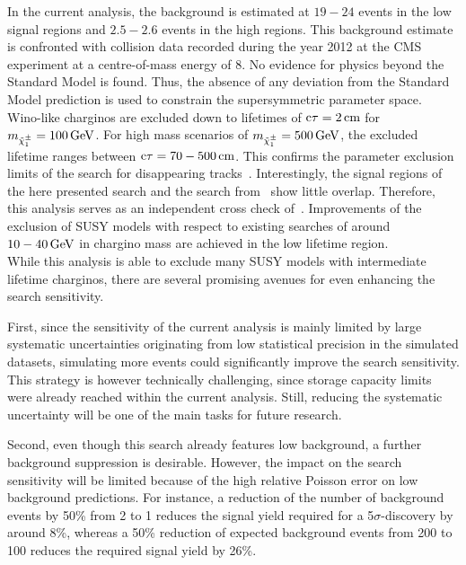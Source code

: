 In the current analysis, the background is estimated at $19-24$ events in the low \ias signal regions and $2.5-2.6$ events in the high \ias regions.
This background estimate is confronted with collision data recorded during the year 2012 at the CMS experiment at a centre-of-mass energy of 8\tev.
No evidence for physics beyond the Standard Model is found. %
Thus, the absence of any deviation from the Standard Model prediction is used to constrain the supersymmetric parameter space.
Wino-like charginos are excluded down to lifetimes of $\text{c}\tau=2\,\text{cm}$ for $m_{\tilde{\chi}^{\pm}_{1}}=100\,\text{Ge}\kern-0.06667em\text{V}$.
For high mass scenarios of $m_{\tilde{\chi}^{\pm}_{1}}=500\,\text{Ge}\kern-0.06667em\text{V}$, the excluded lifetime ranges between $\text{c}\tau=70-500\,\text{cm}$.
This confirms the parameter exclusion limits of the search for disappearing tracks~\cite{bib:CMS:DT_8TeV}.
Interestingly, the signal regions of the here presented search and the search from~\cite{bib:CMS:DT_8TeV} show little overlap.
Therefore, this analysis serves as an independent cross check of~\cite{bib:CMS:DT_8TeV}.
Improvements of the exclusion of SUSY models with respect to existing searches of around $10-40\,\text{Ge}\kern-0.06667em\text{V}$ in chargino mass are achieved in the low lifetime region.\\


While this analysis is able to exclude many SUSY models with intermediate lifetime charginos, there are several promising avenues for even enhancing the search sensitivity.

First, since the sensitivity of the current analysis is mainly limited by large systematic uncertainties originating from low statistical precision in the simulated datasets, simulating more events could significantly improve the search sensitivity.
This strategy is however technically challenging, since storage capacity limits were already reached within the current analysis.
Still, reducing the systematic uncertainty will be one of the main tasks for future research.

Second, even though this search already features low background, a further background suppression is desirable.
However, the impact on the search sensitivity will be limited because of the high relative Poisson error on low background predictions.
For instance, a reduction of the number of background events by 50\% from 2 to 1 reduces the signal yield required for a 5$\sigma$-discovery by around 8\%, whereas a 50\% reduction of expected background events from 200 to 100 reduces the required signal yield by 26\%.

